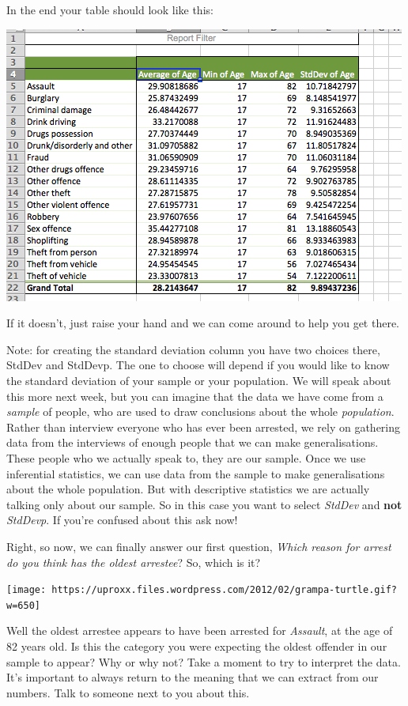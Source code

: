 \documentclass[]{book}
\theoremstyle{definition}
\theoremstyle{definition}
\theoremstyle{definition}
\theoremstyle{remark}
\begin{document}
In the end your table should look like this:

\includegraphics{imgs/reason_v_age_no_med.png}

If it doesn't, just raise your hand and we can come around to help you
get there.

Note: for creating the standard deviation column you have two choices
there, StdDev and StdDevp. The one to choose will depend if you would
like to know the standard deviation of your sample or your population.
We will speak about this more next week, but you can imagine that the
data we have come from a \emph{sample} of people, who are used to draw
conclusions about the whole \emph{population}. Rather than interview
everyone who has ever been arrested, we rely on gathering data from the
interviews of enough people that we can make generalisations. These
people who we actually speak to, they are our sample. Once we use
inferential statistics, we can use data from the sample to make
generalisations about the whole population. But with descriptive
statistics we are actually talking only about our sample. So in this
case you want to select \emph{StdDev} and \textbf{not} \emph{StdDevp}.
If you're confused about this ask now!

Right, so now, we can finally answer our first question, \emph{Which
reason for arrest do you think has the oldest arrestee}? So, which is
it?

\texttt{[image: https://uproxx.files.wordpress.com/2012/02/grampa-turtle.gif?w=650]}

Well the oldest arrestee appears to have been arrested for
\emph{Assault}, at the age of 82 years old. Is this the category you
were expecting the oldest offender in our sample to appear? Why or why
not? Take a moment to try to interpret the data. It's important to
always return to the meaning that we can extract from our numbers. Talk
to someone next to you about this.
\end{document}
